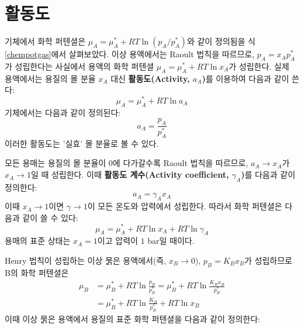     \section{활동도}
        \hspace{\parindent} 기체에서 화학 퍼텐셜은 $\mu_A = \mu_A^\ast + RT\ln{\left(p_A/p_A^\ast\right)}$와 같이 정의됨을 
        식 \ref{chempotgas}에서 살펴보았다. 이상 용액에서는 Raoult 법칙을 따르므로, $p_A = x_A p_A^\ast$가 성립한다는 사실에서 
        용액의 화학 퍼텐셜 $\mu_A = \mu_A^\ast +RT\ln{x_A}$가 성립한다. 실제 용액에서는 용질의 몰 분율 $x_A$ 대신 
        \textbf{활동도(Activity, $a_A$)}를 이용하여 다음과 같이 쓴다:
        \begin{equation*}
            \mu_A = \mu_A^\ast +RT\ln{a_A}
        \end{equation*}
        기체에서는 다음과 같이 정의된다:
        \begin{equation*}
            a_A = \frac{p_A}{p_A^\ast}
        \end{equation*}
        이러한 활동도는 '실효' 몰 분율로 볼 수 있다. 
        \par 모든 용매는 용질의 몰 분율이 0에 다가갈수록 Raoult 법칙을 따르므로, $a_A\rightarrow x_A$가 $x_A\rightarrow 1$일 때 성립한다. 
        이때 \textbf{활동도 계수(Activity coefficient, $\gamma_A$)}를 다음과 같이 정의한다:
        \begin{equation*}
            a_A = \gamma_A x_A
        \end{equation*}
        이때 $x_A\rightarrow 1$이면 $\gamma \rightarrow 1$이 모든 온도와 압력에서 성립한다. 따라서 화학 퍼텐셜은 다음과 같이 쓸 수 있다:
        \begin{equation*}
            \mu_A = \mu_A^\ast + RT\ln{x_A} + RT\ln{\gamma_A}
        \end{equation*}
        용매의 표준 상태는 $x_A=1$이고 압력이 $1$ bar일 때이다.
        \par Henry 법칙이 성립하는 이상 묽은 용액에서(즉, $x_B\rightarrow 0$), $p_B = K_B x_B$가 성립하므로 B의 화학 퍼텐셜은 
        \begin{equation*}
            \begin{aligned}
                \mu_B &= \mu_B^\ast +RT\ln{\frac{p_B}{p_B^\ast}} = \mu_B^\ast +RT \ln{\frac{K_B x_B}{p_B^\ast}}\\
                &= \mu_B^\ast +RT\ln{\frac{K_B}{p_B^\ast}}+RT\ln{x_B}
            \end{aligned}
        \end{equation*}
        이때 이상 묽은 용액에서 용질의 표준 화학 퍼텐셜을 다음과 같이 정의한다:
